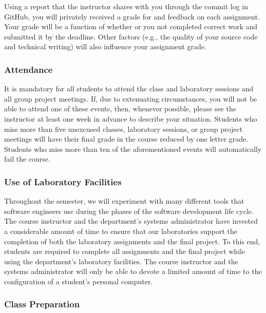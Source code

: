 \documentclass[11pt]{article}
\begin{document}
Using a report that the instructor shares with you through the commit log in GitHub, you will privately received a grade
for and feedback on each assignment. Your grade will be a function of whether or you not completed correct work and
submitted it by the deadline. Other factors (e.g., the quality of your source code and technical writing) will also
influence your assignment grade.

\subsubsection*{Attendance}

It is mandatory for all students to attend the class and laboratory sessions and all group project meetings. If, due to
extenuating circumstances, you will not be able to attend one of these events, then, whenever possible, please see the
instructor at least one week in advance to describe your situation. Students who miss more than five unexcused classes,
laboratory sessions, or group project meetings will have their final grade in the course reduced by one letter grade.
Students who miss more than ten of the aforementioned events will automatically fail the course.

\subsubsection*{Use of Laboratory Facilities}

Throughout the semester, we will experiment with many different tools that software engineers use during the phases of
the software development life cycle. The course instructor and the department's systems administrator have invested a
considerable amount of time to ensure that our laboratories support the completion of both the laboratory assignments
and the final project. To this end, students are required to complete all assignments and the final project while using
the department's laboratory facilities. The course instructor and the systems administrator will only be able to devote
a limited amount of time to the configuration of a student's personal computer.

\subsubsection*{Class Preparation}
\end{document}
